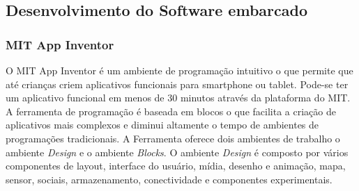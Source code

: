 \documentclass[12pt]{article}
\begin{document}
\subsection{Desenvolvimento do Software embarcado}










\subsubsection{MIT App Inventor}

O MIT App Inventor é um ambiente de programação intuitivo o que permite que até crianças criem aplicativos funcionais para smartphone ou tablet. 
Pode-se ter um aplicativo funcional em menos de 30 minutos através da plataforma do MIT. A ferramenta de programação é baseada em blocos o que facilita a criação de aplicativos mais complexos e diminui altamente o tempo de ambientes de programações tradicionais.
A Ferramenta oferece dois ambientes de trabalho o ambiente \textit{Design} e o ambiente \textit{Blocks}.
O ambiente \textit{Design} é composto por vários componentes de layout, interface do usuário, mídia, desenho e animação, mapa, sensor, sociais, armazenamento, conectividade e componentes experimentais.
\end{document}
